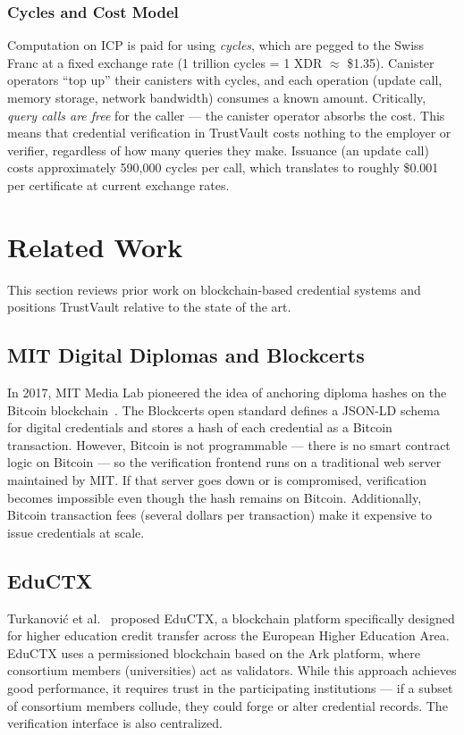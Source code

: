 \documentclass[conference]{IEEEtran}
\begin{document}
\subsubsection{Cycles and Cost Model}
Computation on ICP is paid for using \emph{cycles}, which are pegged to the Swiss Franc at a fixed exchange rate (1 trillion cycles = 1 XDR $\approx$ \$1.35). Canister operators ``top up'' their canisters with cycles, and each operation (update call, memory storage, network bandwidth) consumes a known amount. Critically, \emph{query calls are free} for the caller — the canister operator absorbs the cost. This means that credential verification in TrustVault costs nothing to the employer or verifier, regardless of how many queries they make. Issuance (an update call) costs approximately 590,000 cycles per call, which translates to roughly \$0.001 per certificate at current exchange rates.

\section{Related Work}
\label{sec:related}

This section reviews prior work on blockchain-based credential systems and positions TrustVault relative to the state of the art.

\subsection{MIT Digital Diplomas and Blockcerts}
In 2017, MIT Media Lab pioneered the idea of anchoring diploma hashes on the Bitcoin blockchain~\cite{grech2017blockchain}. The Blockcerts open standard defines a JSON-LD schema for digital credentials and stores a hash of each credential as a Bitcoin transaction. However, Bitcoin is not programmable — there is no smart contract logic on Bitcoin — so the verification frontend runs on a traditional web server maintained by MIT. If that server goes down or is compromised, verification becomes impossible even though the hash remains on Bitcoin. Additionally, Bitcoin transaction fees (several dollars per transaction) make it expensive to issue credentials at scale.

\subsection{EduCTX}
Turkanovi\'{c} et al.~\cite{turk2018eductx} proposed EduCTX, a blockchain platform specifically designed for higher education credit transfer across the European Higher Education Area. EduCTX uses a permissioned blockchain based on the Ark platform, where consortium members (universities) act as validators. While this approach achieves good performance, it requires trust in the participating institutions — if a subset of consortium members collude, they could forge or alter credential records. The verification interface is also centralized.
\end{document}
